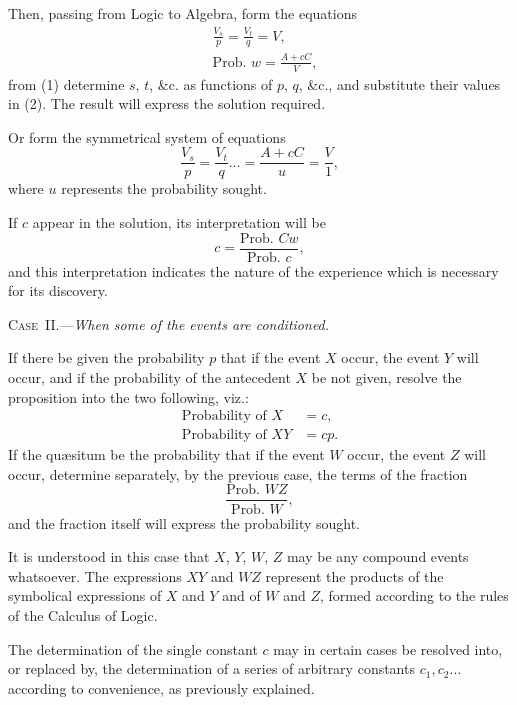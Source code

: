 \documentclass[oneside]{book}
\begin{document}
Then, passing from Logic to Algebra, form the equations
\begin{align*}
  &\frac{V_s}{p} = \frac{V_t}{q} = V,  \tag{1}  \\
  &\text{Prob. } w = \frac{A + cC}{V}, \tag{2}
\end{align*}
from (1) determine $s$, $t$, \&c. as functions of $p$, $q$, \&c., and substitute their values in (2). The result will express the solution
required.

Or form the symmetrical system of equations
\[
  \frac{V_s}{p} = \frac{V_t}{q} \dotsc =  \frac{A+cC}{u}
 = \frac{V}{1},  \tag{3}
\]
where $u$ represents the probability sought.

If $c$ appear in the solution, its interpretation will be
\[
  c = \frac{\text{Prob. }Cw}{\text{Prob. }c},
\]
and this interpretation indicates the nature of the experience
which is necessary for its discovery.

\textsc{Case~II.}---\emph{When some of the events are conditioned.}

If there be given the probability $p$ that if the event $X$ occur,
the event $Y$ will occur, and if the probability of the antecedent
$X$ be not given, resolve the proposition into the two following,
viz.:
\[
\begin{array}{ll}
  \text{Probability of } X  &= c,   \\
  \text{Probability of } XY &= cp.
\end{array}
\]
If the qu{\ae}situm be the probability that if the event $W$ occur,
the event $Z$ will occur, determine separately, by the previous
case, the terms of the fraction
\[
  \frac{\text{Prob. } WZ}{\text{Prob. }W},
\]
and the fraction itself will express the probability sought.

It is understood in this case that $X$, $Y$, $W$, $Z$ may be any
compound events whatsoever. The expressions $XY$ and $WZ$
represent the products of the symbolical expressions of $X$ and $Y$
and of $W$ and $Z$, formed according to the rules of the Calculus of
Logic.

The determination of the single constant $c$ may in certain
cases be resolved into, or replaced by, the determination of a series
of arbitrary constants $c_1, c_2\dotsc$ according to convenience, as previously
explained.
\end{document}
